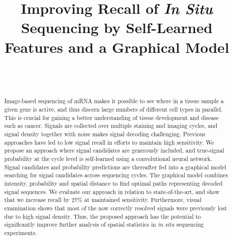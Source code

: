 \documentclass[10pt,journal]{IEEEtran}
\begin{document}
%
\title{Improving Recall of \textit{In Situ} Sequencing by Self-Learned Features and a Graphical Model}


%
%
%
%
\author{\\
\\
}


\maketitle


\begin{abstract}
Image-based sequencing of mRNA makes it possible to see where in a tissue sample a given gene is active, and thus discern large numbers of different cell types in parallel. This is crucial for gaining a better understanding of tissue development and disease such as cancer. Signals are collected over multiple staining and imaging cycles, and signal density together with noise makes signal decoding challenging. Previous approaches have led to low signal recall in efforts to maintain high sensitivity. We propose an approach where signal candidates are generously included, and true-signal probability at the cycle level is self-learned using a convolutional neural network. Signal candidates and probability predictions are thereafter fed into a graphical model searching for signal candidates across sequencing cycles. The graphical model combines intensity, probability and spatial distance to find optimal paths representing decoded signal sequences. We evaluate our approach in relation to state-of-the-art, and show that we increase recall by $27\%$  at maintained sensitivity. Furthermore, visual examination shows that most of the now correctly resolved signals were previously lost due to high signal density. Thus, the proposed approach has the potential to significantly improve further analysis of spatial statistics in \textit{in situ} sequencing experiments.

\end{abstract}
\end{document}
